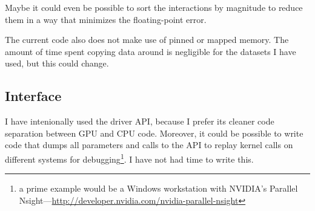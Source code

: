 Maybe it could even be possible to sort the interactions by magnitude to reduce them in a way that minimizes the floating-point error.

The current code also does not make use of pinned or mapped memory. The amount of time spent copying data around is negligible for the datasets I have used, but this could change.

\subsection{\cuda{} Interface}
I have intenionally used the driver API, because I prefer its cleaner code separation between GPU and CPU code. Moreover, it could be possible to write code that dumps all parameters and calls to the API to replay kernel calls on different systems for debugging\footnote{a prime example would be a Windows workstation with NVIDIA's Parallel Nsight---\url{http://developer.nvidia.com/nvidia-parallel-nsight}}. I have not had time to write this.

